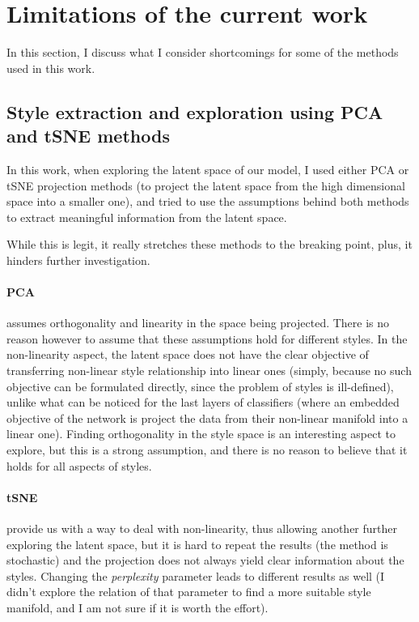 \section{Limitations of the current work}
  In this section, I discuss what I consider shortcomings for some of the methods used in this work.

  \subsection{Style extraction and exploration using PCA and tSNE methods}
    In this work, when exploring the latent space of our model, I used either PCA or tSNE projection methods (to project the latent space from the high dimensional space into a smaller one), and tried to use the assumptions behind both methods to extract meaningful information from the latent space.

    While this is legit, it really stretches these methods to the breaking point, plus, it hinders further investigation.

    \paragraph{PCA} assumes orthogonality and linearity in the space being projected. There is no reason however to assume that these assumptions hold for different styles.
    In the non-linearity aspect, the latent space does not have the clear objective of transferring non-linear style relationship into linear ones (simply, because no such objective can be formulated directly, since the problem of styles is ill-defined), unlike what can be noticed for the last layers of classifiers (where an embedded objective of the network is project the data from their non-linear manifold into a linear one). Finding orthogonality in the style space is an interesting aspect to explore, but this is a strong assumption, and there is no reason to believe that it holds for all aspects of styles.
    \paragraph{tSNE} provide us with a way to deal with non-linearity, thus allowing another further exploring the latent space, but it is hard to repeat the results (the method is stochastic) and the projection does not always yield clear information about the styles. Changing the \textit{perplexity} parameter leads to different results as well (I didn't explore the relation of that parameter to find a more suitable style manifold, and I am not sure if it is worth the effort).

